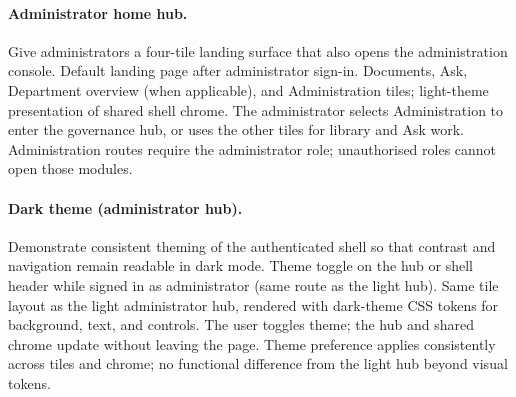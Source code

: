\paragraph{Administrator home hub.}
\uiexplain
{Give administrators a four-tile landing surface that also opens the
administration console.}
{Default landing page after administrator sign-in.}
{Documents, Ask, Department overview (when applicable), and Administration tiles;
light-theme presentation of shared shell chrome.}
{The administrator selects Administration to enter the governance hub, or uses
the other tiles for library and Ask work.}
{Administration routes require the administrator role; unauthorised roles cannot
open those modules.}

\paragraph{Dark theme (administrator hub).}
\uiexplain
{Demonstrate consistent theming of the authenticated shell so that contrast and
navigation remain readable in dark mode.}
{Theme toggle on the hub or shell header while signed in as administrator (same
route as the light hub).}
{Same tile layout as the light administrator hub, rendered with dark-theme CSS
tokens for background, text, and controls.}
{The user toggles theme; the hub and shared chrome update without leaving the
page.}
{Theme preference applies consistently across tiles and chrome; no functional
difference from the light hub beyond visual tokens.}
